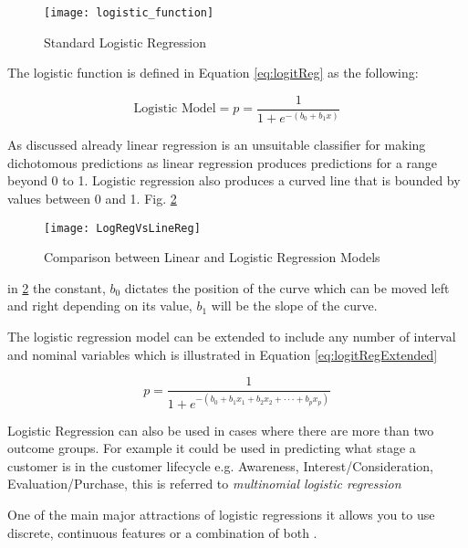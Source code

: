 \begin{figure}[H]
	\texttt{[image: logistic\_function]}
	\caption[Standard Logistic Regression]
	{Standard Logistic Regression}
	\label{fig:logistic_function}
\end{figure}

The logistic function is defined in Equation \ref{eq:logitReg} as the following: 

\begin{equation} \label{eq:logitReg}
	\text{Logistic Model}  =  p  =  \frac{1}{1 + e^{-(b_0 + b_1x)}}
\end{equation}

As discussed already linear regression is an unsuitable classifier for making dichotomous predictions as linear regression produces predictions for a range beyond 0 to 1. Logistic regression also produces a curved line that is bounded by values between 0 and 1. Fig. \ref{fig:LogRegVsLineReg}

\begin{figure}[H]
	\texttt{[image: LogRegVsLineReg]}
	\caption{Comparison between Linear and Logistic Regression Models}
	\label{fig:LogRegVsLineReg}
\end{figure}

in \ref{fig:LogRegVsLineReg} the constant, $b_0$ dictates the position of the curve which can be moved left and right depending on its value, $b_1$ will be the slope of the curve. 

The logistic regression model can be extended to include any number of interval and nominal variables which is illustrated in Equation \ref{eq:logitRegExtended}

\begin{equation} \label{eq:logitRegExtended}
	p  =  \frac{1}{1 + e^{-(b_0 + b_1x_1 + b_2x_2 +\cdot\cdot\cdot+ b_px_p )}}
\end{equation}

Logistic Regression can also be used in cases where there are more than two outcome groups. For example it could be used in predicting what stage a customer is in the customer lifecycle e.g. Awareness, Interest/Consideration, Evaluation/Purchase, this is referred to \textit{multinomial logistic regression}


One of the main major attractions of logistic regressions it allows you to use discrete, continuous features or a combination of both \citep{lee_application_2005}.

